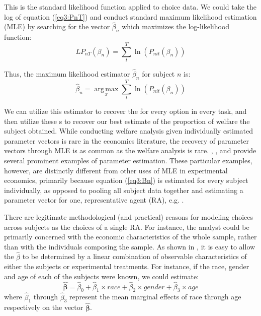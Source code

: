 \documentclass[../main.tex]{subfiles}
\begin{document}
\noindent This is the standard likelihood function applied to choice data.
We could take the log of equation (\ref{eq3:PnT}) and conduct standard maximum likelihood estimation (MLE) by searching for the vector $\hat{\beta}_n$ which maximizes the log-likelihood function:
\begin{equation}
	\label{eq3:LPnT}
	\mathit{LP}_{nT}(\beta_n) = \sum_{t}^{T} \ln \left( P_{nit}(\beta_n) \right)
\end{equation}

\noindent Thus, the maximum likelihood estimator $\hat{\beta}_n$ for subject $n$ is:
\begin{equation}
	\label{eq3:Bn}
	\hat{\beta}_n = \underset{x}{\operatorname{arg\,max}}\sum_t^T \ln \left( P_{nit}(\beta_n) \right)
\end{equation}

We can utilize this estimator to recover the {\CE} for every option in every task, and then utilize these \CE s to recover our best estimate of the proportion of welfare the subject obtained. 
While conducting welfare analysis given individually estimated parameter vectors is rare in the economics literature,{\footnotemark} the recovery of parameter vectors through MLE is as common as the welfare analysis is rare.
\textcite{Hey1994}, \textcite{Wilcox2015}, and \textcite{Hey2001} provide several prominent examples of parameter estimation.
These particular examples, however, are distinctly different from other uses of MLE in experimental economics, primarily because equation (\ref{eq3:Bn}) is estimated for every subject individually, as opposed to pooling all subject data together and estimating a parameter vector for one, representative agent (RA), e.g. \textcite{Camerer1994}.

\addtocounter{footnote}{-1}

There are legitimate methodological (and practical) reasons for modeling choices across subjects as the choices of a single RA.
For instance, the analyst could be primarily concerned with the economic characteristics of the whole sample, rather than with the individuals composing the sample.
As shown in \textcite[142]{Harrison2008a}, it is easy to allow the $\hat{\beta}$ to be determined by a linear combination of observable characteristics of either the subjects or experimental treatments.
For instance, if the race, gender and age of each of the subjects were known, we could estimate:
\begin{equation}
	\label{eq3:BB}
	\bm{\hat{\beta}} = \hat{\beta}_0 + \hat{\beta}_1 \times \mathit{race} + \hat{\beta}_2 \times \mathit{gender} + \hat{\beta}_3 \times \mathit{age}
\end{equation}
\noindent where $\hat{\beta}_1$ through $\hat{\beta}_3$ represent the mean marginal effects of race through age respectively on the vector $\bm{\hat{\beta}}$.
\end{document}
